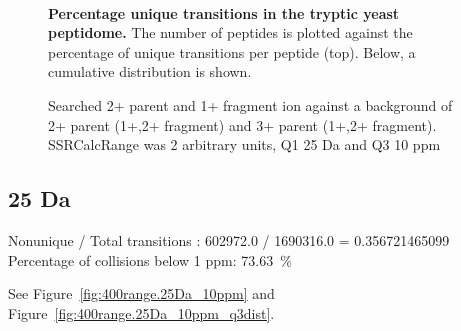 \begin{figure}

\center
{} \\

\caption{ \textbf{Percentage unique transitions in the tryptic yeast peptidome.}
The number of peptides is plotted against the percentage of unique transitions
per peptide (top). Below, a cumulative distribution is shown.
}
\label{fig:400range.50Da_10ppm}
\end{figure}
\begin{figure}

\center
{}

\caption{
Searched 2+ parent and 1+ fragment ion against a background of 2+ parent (1+,2+ fragment) and 3+ parent (1+,2+ fragment).
SSRCalcRange was 2 arbitrary units, Q1 25 Da and Q3 10 ppm
}
\label{fig:400range.50Da_10ppm_q3dist}
\end{figure}

\subsection{25 Da}

Nonunique / Total transitions : 602972.0 / 1690316.0 = 0.356721465099
Percentage of collisions below 1 ppm: 73.63~\%


See Figure~\ref{fig:400range.25Da_10ppm} and Figure~\ref{fig:400range.25Da_10ppm_q3dist}.

